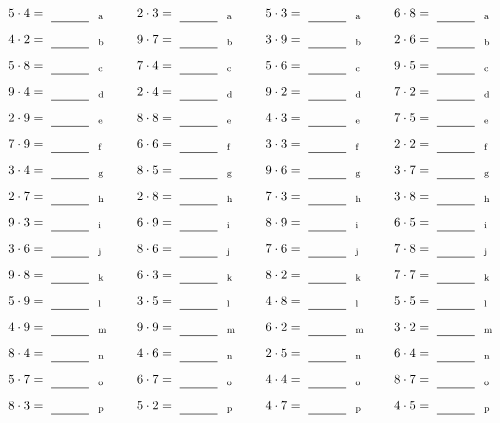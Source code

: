 \documentclass
[
  draft    = true,
  fontsize = 11pt,
  parskip  = half-
]
{scrartcl}
\begin{document}
\par\vfill\par
\begin{align*}
    \pline{5\cdot4}&=\rline{a}
  & \pline{2\cdot3}&=\rline{a}
  & \pline{5\cdot3}&=\rline{a}
  & \pline{6\cdot8}&=\rline{a} \\[1ex]
    \pline{4\cdot2}&=\rline{b}
  & \pline{9\cdot7}&=\rline{b}
  & \pline{3\cdot9}&=\rline{b}
  & \pline{2\cdot6}&=\rline{b} \\[1ex]
    \pline{5\cdot8}&=\rline{c}
  & \pline{7\cdot4}&=\rline{c}
  & \pline{5\cdot6}&=\rline{c}
  & \pline{9\cdot5}&=\rline{c} \\[1ex]
    \pline{9\cdot4}&=\rline{d}
  & \pline{2\cdot4}&=\rline{d}
  & \pline{9\cdot2}&=\rline{d}
  & \pline{7\cdot2}&=\rline{d} \\[1ex]
    \pline{2\cdot9}&=\rline{e}
  & \pline{8\cdot8}&=\rline{e}
  & \pline{4\cdot3}&=\rline{e}
  & \pline{7\cdot5}&=\rline{e} \\[1ex]
    \pline{7\cdot9}&=\rline{f}
  & \pline{6\cdot6}&=\rline{f}
  & \pline{3\cdot3}&=\rline{f}
  & \pline{2\cdot2}&=\rline{f} \\[1ex]
    \pline{3\cdot4}&=\rline{g}
  & \pline{8\cdot5}&=\rline{g}
  & \pline{9\cdot6}&=\rline{g}
  & \pline{3\cdot7}&=\rline{g} \\[1ex]
    \pline{2\cdot7}&=\rline{h}
  & \pline{2\cdot8}&=\rline{h}
  & \pline{7\cdot3}&=\rline{h}
  & \pline{3\cdot8}&=\rline{h} \\[1ex]
    \pline{9\cdot3}&=\rline{i}
  & \pline{6\cdot9}&=\rline{i}
  & \pline{8\cdot9}&=\rline{i}
  & \pline{6\cdot5}&=\rline{i} \\[1ex]
    \pline{3\cdot6}&=\rline{j}
  & \pline{8\cdot6}&=\rline{j}
  & \pline{7\cdot6}&=\rline{j}
  & \pline{7\cdot8}&=\rline{j} \\[1ex]
    \pline{9\cdot8}&=\rline{k}
  & \pline{6\cdot3}&=\rline{k}
  & \pline{8\cdot2}&=\rline{k}
  & \pline{7\cdot7}&=\rline{k} \\[1ex]
    \pline{5\cdot9}&=\rline{l}
  & \pline{3\cdot5}&=\rline{l}
  & \pline{4\cdot8}&=\rline{l}
  & \pline{5\cdot5}&=\rline{l} \\[1ex]
    \pline{4\cdot9}&=\rline{m}
  & \pline{9\cdot9}&=\rline{m}
  & \pline{6\cdot2}&=\rline{m}
  & \pline{3\cdot2}&=\rline{m} \\[1ex]
    \pline{8\cdot4}&=\rline{n}
  & \pline{4\cdot6}&=\rline{n}
  & \pline{2\cdot5}&=\rline{n}
  & \pline{6\cdot4}&=\rline{n} \\[1ex]
    \pline{5\cdot7}&=\rline{o}
  & \pline{6\cdot7}&=\rline{o}
  & \pline{4\cdot4}&=\rline{o}
  & \pline{8\cdot7}&=\rline{o} \\[1ex]
    \pline{8\cdot3}&=\rline{p}
  & \pline{5\cdot2}&=\rline{p}
  & \pline{4\cdot7}&=\rline{p}
  & \pline{4\cdot5}&=\rline{p}
\end{align*}
\end{document}
